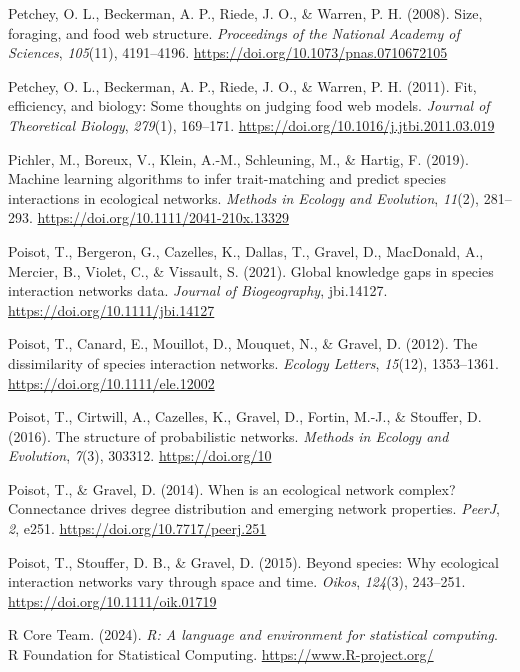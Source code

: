 \documentclass[
]{article}
\newlength{\cslhangindent}
\newenvironment{CSLReferences}[2] %
 {\begin{list}{}{%
  \setlength{\itemindent}{0pt}
  \setlength{\leftmargin}{0pt}
  \setlength{\parsep}{0pt}
  \ifodd #1
   \setlength{\leftmargin}{\cslhangindent}
   \setlength{\itemindent}{-1\cslhangindent}
  \fi
  \setlength{\itemsep}{#2\baselineskip}}}
 {\end{list}}
\begin{document}
\begin{CSLReferences}{1}{0}
Petchey, O. L., Beckerman, A. P., Riede, J. O., \& Warren, P. H. (2008).
Size, foraging, and food web structure. \emph{Proceedings of the
National Academy of Sciences}, \emph{105}(11), 4191--4196.
\url{https://doi.org/10.1073/pnas.0710672105}

Petchey, O. L., Beckerman, A. P., Riede, J. O., \& Warren, P. H. (2011).
Fit, efficiency, and biology: Some thoughts on judging food web models.
\emph{Journal of Theoretical Biology}, \emph{279}(1), 169--171.
\url{https://doi.org/10.1016/j.jtbi.2011.03.019}

Pichler, M., Boreux, V., Klein, A.-M., Schleuning, M., \& Hartig, F.
(2019). Machine learning algorithms to infer trait{-}matching and
predict species interactions in ecological networks. \emph{Methods in
Ecology and Evolution}, \emph{11}(2), 281--293.
\url{https://doi.org/10.1111/2041-210x.13329}

Poisot, T., Bergeron, G., Cazelles, K., Dallas, T., Gravel, D.,
MacDonald, A., Mercier, B., Violet, C., \& Vissault, S. (2021). Global
knowledge gaps in species interaction networks data. \emph{Journal of
Biogeography}, jbi.14127. \url{https://doi.org/10.1111/jbi.14127}

Poisot, T., Canard, E., Mouillot, D., Mouquet, N., \& Gravel, D. (2012).
The dissimilarity of species interaction networks. \emph{Ecology
Letters}, \emph{15}(12), 1353--1361.
\url{https://doi.org/10.1111/ele.12002}

Poisot, T., Cirtwill, A., Cazelles, K., Gravel, D., Fortin, M.-J., \&
Stouffer, D. (2016). The structure of probabilistic networks.
\emph{Methods in Ecology and Evolution}, \emph{7}(3), 303312.
\url{https://doi.org/10}

Poisot, T., \& Gravel, D. (2014). When is an ecological network complex?
Connectance drives degree distribution and emerging network properties.
\emph{PeerJ}, \emph{2}, e251. \url{https://doi.org/10.7717/peerj.251}

Poisot, T., Stouffer, D. B., \& Gravel, D. (2015). Beyond species: Why
ecological interaction networks vary through space and time.
\emph{Oikos}, \emph{124}(3), 243--251.
\url{https://doi.org/10.1111/oik.01719}

R Core Team. (2024). \emph{R: A language and environment for statistical
computing}. R Foundation for Statistical Computing.
\url{https://www.R-project.org/}


\end{CSLReferences}
\end{document}
